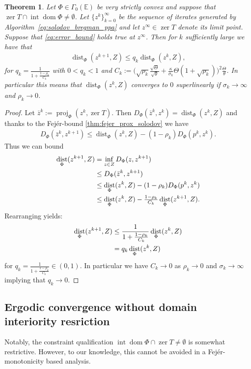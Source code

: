 \documentclass[11pt,onecolumn]{article}
\DeclareMathOperator{\dom}{dom}
\DeclareMathOperator{\intr}{int}
\DeclareMathOperator{\proj}{proj}
\DeclareMathOperator{\zer}{zer}
\DeclareMathOperator{\dist}{dist}
\newtheorem{theorem}{Theorem}[section]
\theoremstyle{remark}
\begin{document}
\begin{theorem}
Let $\Phi\in \Gamma_0(\mathbb{E})$ be very strictly convex and suppose that $\zer T \cap \intr\dom \Phi \neq \emptyset$.
    Let $\{z^k\}_{k=0}^\infty$ be the sequence of iterates generated by Algorithm~\ref{eq:solodov_bregman_ppa} and let $z^\infty \in \zer T$ denote its limit point. Suppose that \cref{eq:error_bound} holds true at $z^\infty$. Then for $k$ sufficiently large we have that
    \begin{align*}
        \dist_\Phi(z^{k+1}, Z)\leq q_k \dist_\Phi(z^k, Z),
    \end{align*}
    for $q_k= \frac{1}{1+ \tfrac{1-\rho_k}{C_k}}$ with $0 < q_k < 1$ and $C_k:=\big(\sqrt{\rho_k} \tfrac{\sqrt{\Theta}}{\sqrt{\theta}}+\tfrac{\kappa}{\sigma_k}\Theta(1+\sqrt{\rho_k})\big)^2 \tfrac{\Theta}{\theta}$.
    In particular this means that $\dist_\Phi(z^k, Z)$ converges to $0$ superlinearly if $\sigma_k \to \infty$ and $\rho_k \to 0$.
\end{theorem}
\begin{proof}
Let $\bar z^k:=\proj_\Phi(z^k, \zer T)$. Then $D_\Phi(\bar z^k, z^{k}) = \dist_\Phi(z^k, Z)$ and thanks to the Fej\'er-bound \cref{thm:fejer_prox_solodov} we have
\begin{align}
    D_\Phi(\bar z^k, z^{k+1}) \leq \dist_\Phi(z^k, Z) - (1 -\rho_k)D_\Phi(p^k,z^k).
\end{align}
Thus we can bound
\begin{align}
   \dist_\Phi(z^{k+1}, Z) &= \inf_{z \in Z} D_\Phi(z, z^{k+1}) \notag\\
   &\leq D_\Phi(\bar z^k, z^{k+1}) \notag\\
   &\leq \dist_\Phi(z^k, Z)- (1 -\rho_k)D_\Phi(p^k,z^k) \notag\\
   &\leq  \dist_\Phi(z^k, Z) - \tfrac{1-\rho_k}{C_k} \dist_\Phi(z^{k+1}, Z).
\end{align}
Rearranging yields:
\begin{align}
  \dist_\Phi(z^{k+1}, Z) &\leq  \frac{1}{1+ \tfrac{1-\rho_k}{C_k}}\dist_\Phi(z^k, Z) \notag\\
  &= q_k\dist_\Phi(z^k, Z)
\end{align}
for $q_k=  \frac{1}{1+ \tfrac{1-\rho_k}{C_k}} \in(0,1)$. In particular we have $C_k \to 0$ as $\rho_k \to 0$ and $\sigma_k \to \infty$ implying that $q_k \to 0$. 
\end{proof}

\subsection{Ergodic convergence without domain interiority resriction} \label{sec:ergodic_ppa}
Notably, the constraint qualification $\intr \dom \Phi \cap \zer T \neq \emptyset$ is somewhat restrictive. However, to our knowledge, this cannot be avoided in a Fej\'er-monotonicity based analysis.
\end{document}
